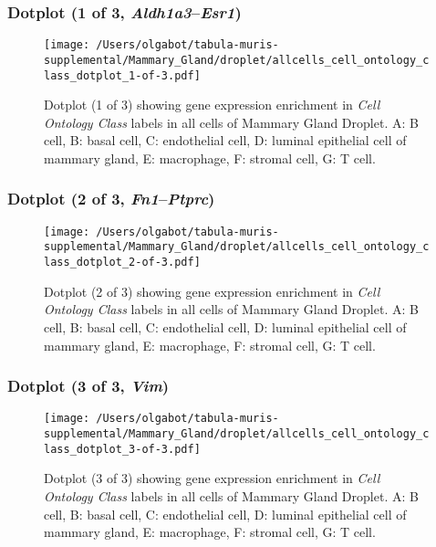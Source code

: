 \clearpage

\subsubsection{Dotplot (1 of 3, \emph{Aldh1a3}--\emph{Esr1})}
\begin{figure}[h]
\centering
\texttt{[image: /Users/olgabot/tabula-muris-supplemental/Mammary\_Gland/droplet/allcells\_cell\_ontology\_class\_dotplot\_1-of-3.pdf]}

\caption{ Dotplot (1 of 3)  showing gene expression enrichment in \emph{Cell Ontology Class} labels in all cells of Mammary Gland Droplet. A: B cell, B: basal cell, C: endothelial cell, D: luminal epithelial cell of mammary gland, E: macrophage, F: stromal cell, G: T cell.}
\end{figure}


\clearpage

\subsubsection{Dotplot (2 of 3, \emph{Fn1}--\emph{Ptprc})}
\begin{figure}[h]
\centering
\texttt{[image: /Users/olgabot/tabula-muris-supplemental/Mammary\_Gland/droplet/allcells\_cell\_ontology\_class\_dotplot\_2-of-3.pdf]}

\caption{ Dotplot (2 of 3)  showing gene expression enrichment in \emph{Cell Ontology Class} labels in all cells of Mammary Gland Droplet. A: B cell, B: basal cell, C: endothelial cell, D: luminal epithelial cell of mammary gland, E: macrophage, F: stromal cell, G: T cell.}
\end{figure}


\clearpage

\subsubsection{Dotplot (3 of 3, \emph{Vim})}
\begin{figure}[h]
\centering
\texttt{[image: /Users/olgabot/tabula-muris-supplemental/Mammary\_Gland/droplet/allcells\_cell\_ontology\_class\_dotplot\_3-of-3.pdf]}

\caption{ Dotplot (3 of 3)  showing gene expression enrichment in \emph{Cell Ontology Class} labels in all cells of Mammary Gland Droplet. A: B cell, B: basal cell, C: endothelial cell, D: luminal epithelial cell of mammary gland, E: macrophage, F: stromal cell, G: T cell.}
\end{figure}


